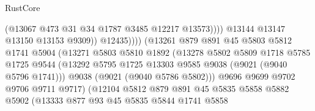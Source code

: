 \begin{lexlean}{RustCore}
\begin{coremodule}
                                                  (@13067 @473 @31 @34 @1787 @3485 @12217 @13573))))
                                            @13144
                                            @13147
                                            @13150
                                            @13153
                                            @9309))
                                        @12435))))
                                (@13261
                                  @879
                                  @891
                                  @45
                                  @5803
                                  @5812
                                  @1741
                                  @5904
                                  (@13271
                                    @5803
                                    @5810
                                    @1892
                                    (@13278
                                      @5802
                                      @5809
                                      @1718
                                      @5785
                                      @1725
                                      @9544
                                      (@13292
                                        @5795
                                        @1725
                                        @13303
                                        @9585
                                        @9038
                                        (@9021 (@9040 @5796 @1741)))
                                      @9038
                                      (@9021 (@9040 @5786 @5802)))
                                    @9696
                                    @9699
                                    @9702
                                    @9706
                                    @9711
                                    @9717)
                                  (@12104
                                    @5812
                                    @879
                                    @891
                                    @45
                                    @5835
                                    @5858
                                    @5882
                                    @5902
                                    (@13333
                                      @877
                                      @93
                                      @45
                                      @5835
                                      @5844
                                      @1741
                                      @5858

\end{coremodule}
\end{lexlean}
